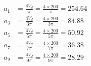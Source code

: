 \subsection{}

\begin{align*}
a_1 & = \frac{4V_d}{\pi} = \frac{4\times 200}{\pi} = 254.64 \\
a_3 & = \frac{4V_d}{3\pi} = \frac{4\times 200}{3\pi} = 84.88 \\
a_5 & = \frac{4V_d}{5\pi} = \frac{4\times 200}{5\pi} = 50.92 \\
a_7 & = \frac{4V_d}{7\pi} = \frac{4\times 200}{7\pi} = 36.38 \\
a_9 & = \frac{4V_d}{9\pi} = \frac{4\times 200}{9\pi} = 28.29 \\
\end{align*}
